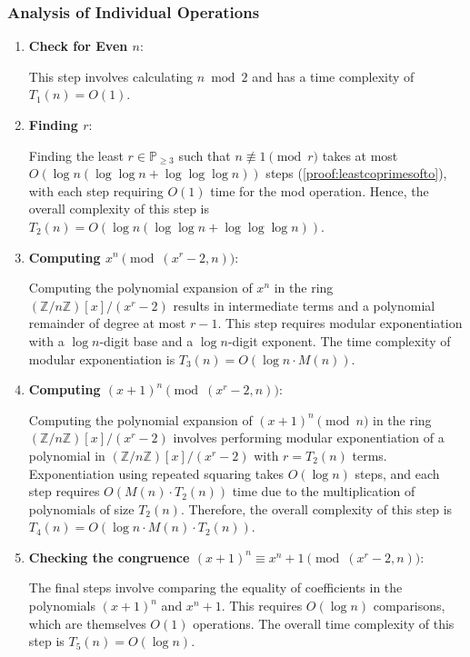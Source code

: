 \documentclass{article}
\theoremstyle{plain}
\theoremstyle{definition}
\newcommand{\Z}{\mathbb{Z}}
\begin{document}
\subsubsection{Analysis of Individual Operations}
\begin{enumerate}
    \item \textbf{Check for Even $n$}:
    
        This step involves calculating $n \bmod{2}$ and has a time complexity of $T_1(n) = O(1)$.

    \item \textbf{Finding $r$}:
    
        Finding the least $r \in \mathbb{P}_{\geq 3}$ such that $n \not\equiv 1 \pmod{r}$ takes at most $O(\log n (\log \log n + \log \log \log n))$ steps (\cref{proof:leastcoprimesofto}), with each step requiring $O(1)$ time for the mod operation. Hence, the overall complexity of this step is $ T_2(n) = O(\log n (\log \log n + \log \log \log n))$.

    \item \textbf{Computing $x^n \pmod{(x^r-2,n)}$}:
    
        Computing the polynomial expansion of $x^n$ in the ring $(\Z/n\Z)[x]/(x^r-2)$ results in intermediate terms and a polynomial remainder of degree at most $r-1$. This step requires modular exponentiation with a $\log n$-digit base and a $\log n$-digit exponent. The time complexity of modular exponentiation is $ T_3(n) = O(\log n \cdot M(n))$.

    \item \textbf{Computing $(x+1)^n \pmod{(x^r-2,n)}$}:
    
        Computing the polynomial expansion of $(x+1)^n \pmod{n}$ in the ring $(\Z/n\Z)[x]/(x^r-2)$ involves performing modular exponentiation of a polynomial in $(\Z/n\Z)[x]/(x^r-2)$ with $r = T_2(n)$ terms. Exponentiation using repeated squaring takes $O(\log n)$ steps, and each step requires $O(M(n) \cdot T_2(n))$ time due to the multiplication of polynomials of size $T_2(n)$. Therefore, the overall complexity of this step is $ T_4(n) = O(\log n \cdot  M(n) \cdot  T_2(n))$.
         
    \item \textbf{Checking the congruence $(x+1)^n \equiv x^n+1 \pmod{(x^r-2,n)}$}:
    
    The final steps involve comparing the equality of coefficients in the polynomials $(x+1)^n$ and $x^n+1$. This requires $O(\log n)$ comparisons, which are themselves $O(1)$ operations. The overall time complexity of this step is $T_5(n) = O(\log n)$.
\end{enumerate}
\end{document}
